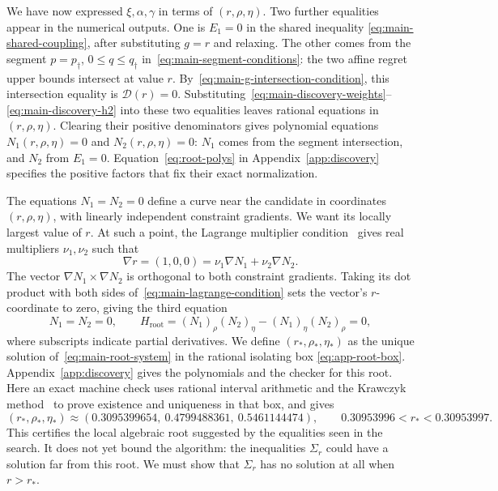 \documentclass[11pt]{article}
\theoremstyle{remark}
\theoremstyle{plain}
\begin{document}
We have now expressed $\xi,\alpha,\gamma$ in terms of
$(r,\rho,\eta)$. Two further equalities appear in the numerical
outputs. One is $E_1=0$ in the shared inequality
\eqref{eq:main-shared-coupling}, after substituting $g=r$ and relaxing.
The other comes from the segment $p=p_\dagger$, $0\le q\le q_\dagger$
in~\eqref{eq:main-segment-conditions}: the two affine regret upper
bounds intersect at value $r$. By~\eqref{eq:main-g-intersection-condition},
this intersection equality is $\mathcal D(r)=0$.
Substituting~\eqref{eq:main-discovery-weights}--\eqref{eq:main-discovery-h2}
into these two equalities leaves rational equations in $(r,\rho,\eta)$.
Clearing their positive denominators gives polynomial equations
$N_1(r,\rho,\eta)=0$ and $N_2(r,\rho,\eta)=0$:
$N_1$ comes from the segment intersection, and $N_2$ from $E_1=0$.
Equation~\eqref{eq:root-polys} in Appendix~\ref{app:discovery}
specifies the positive factors that fix their exact normalization.

The equations $N_1=N_2=0$ define a curve near the candidate in
coordinates $(r,\rho,\eta)$, with linearly independent constraint
gradients. We want its locally largest value of $r$. At such a
point, the Lagrange
multiplier condition~\cite{nocedal2006} gives real
multipliers $\nu_1,\nu_2$ such that
\begin{equation}
 \nabla r=(1,0,0)=\nu_1\nabla N_1+\nu_2\nabla N_2.
 \label{eq:main-lagrange-condition}
\end{equation}
The vector $\nabla N_1\times\nabla N_2$ is orthogonal to both
constraint gradients. Taking its dot product with both sides
of~\eqref{eq:main-lagrange-condition} sets the vector's
$r$-coordinate to zero, giving the third equation
\begin{equation}
 N_1=N_2=0,\qquad
 H_{\mathrm{root}}=(N_1)_\rho(N_2)_\eta-(N_1)_\eta(N_2)_\rho=0,
 \label{eq:main-root-system}
\end{equation}
where subscripts indicate partial derivatives. We define
$(r_*,\rho_*,\eta_*)$ as the unique solution of~\eqref{eq:main-root-system} in the rational isolating box
\eqref{eq:app-root-box}. Appendix~\ref{app:discovery} gives the
polynomials and the checker for this root. Here an exact machine
check uses rational interval arithmetic and the Krawczyk
method~\cite{moore2009,krawczyk1969} to prove
existence and uniqueness in that box, and gives
\[
 (r_*,\rho_*,\eta_*)\approx
 (0.3095399654,\ 0.4799488361,\ 0.5461144474),\qquad
 0.30953996<r_*<0.30953997.
\]
This certifies the local algebraic root suggested by the equalities
seen in the search. It does not yet bound the algorithm: the
inequalities $\Sigma_r$ could have a solution far from this root.
We must show that $\Sigma_r$ has no solution at all when $r>r_*$.
\end{document}
